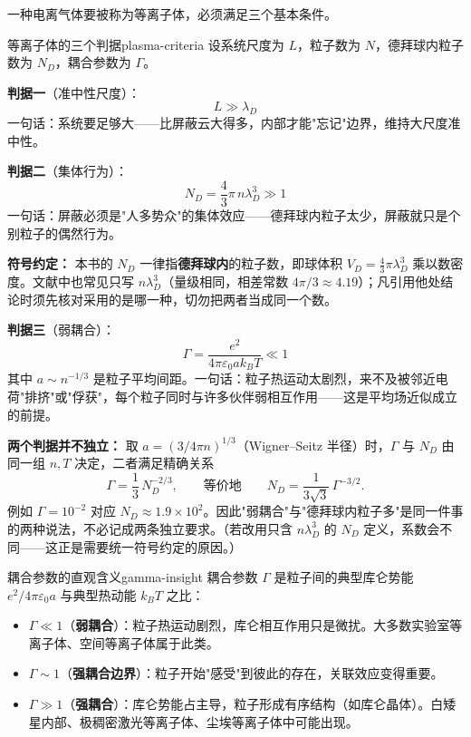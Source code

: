 \documentclass[12pt,a4paper,openany,oneside]{book}
\newcommand{\eps}{\varepsilon}
\begin{document}
一种电离气体要被称为等离子体，必须满足三个基本条件。

\begin{theorem}{等离子体的三个判据}{plasma-criteria}
设系统尺度为 $L$，粒子数为 $N$，德拜球内粒子数为 $N_D$，耦合参数为 $\Gamma$。

\textbf{判据一}（准中性尺度）：
\[
L \gg \lambda_D
\]
一句话：系统要足够大——比屏蔽云大得多，内部才能"忘记"边界，维持大尺度准中性。

\textbf{判据二}（集体行为）：
\[
N_D = \frac{4}{3}\pi\, n\lambda_D^3 \gg 1
\]
一句话：屏蔽必须是"人多势众"的集体效应——德拜球内粒子太少，屏蔽就只是个别粒子的偶然行为。

\textbf{符号约定：} 本书的 $N_D$ 一律指\textbf{德拜球内}的粒子数，即球体积 $V_D=\frac43\pi\lambda_D^3$ 乘以数密度。文献中也常见只写 $n\lambda_D^3$（量级相同，相差常数 $4\pi/3\approx4.19$）；凡引用他处结论时须先核对采用的是哪一种，切勿把两者当成同一个数。

\textbf{判据三}（弱耦合）：
\[
\Gamma = \frac{e^2}{4\pi\eps_0 a k_B T} \ll 1
\]
其中 $a \sim n^{-1/3}$ 是粒子平均间距。一句话：粒子热运动太剧烈，来不及被邻近电荷"排挤"或"俘获"，每个粒子同时与许多伙伴弱相互作用——这是平均场近似成立的前提。

\textbf{两个判据并不独立：} 取 $a=(3/4\pi n)^{1/3}$（Wigner--Seitz 半径）时，$\Gamma$ 与 $N_D$ 由同一组 $n,T$ 决定，二者满足精确关系
\[
\Gamma = \frac{1}{3}\,N_D^{-2/3},
\qquad\text{等价地}\qquad
N_D = \frac{1}{3\sqrt{3}}\,\Gamma^{-3/2}.
\]
例如 $\Gamma=10^{-2}$ 对应 $N_D\approx 1.9\times10^{2}$。因此"弱耦合"与"德拜球内粒子多"是同一件事的两种说法，不必记成两条独立要求。（若改用只含 $n\lambda_D^3$ 的 $N_D$ 定义，系数会不同——这正是需要统一符号约定的原因。）
\end{theorem}

\begin{insight}{耦合参数的直观含义}{gamma-insight}
耦合参数 $\Gamma$ 是粒子间的典型库仑势能 $e^2/4\pi\eps_0 a$ 与典型热动能 $k_BT$ 之比：
\begin{itemize}
\item $\Gamma \ll 1$（\textbf{弱耦合}）：粒子热运动剧烈，库仑相互作用只是微扰。大多数实验室等离子体、空间等离子体属于此类。
\item $\Gamma \sim 1$（\textbf{强耦合边界}）：粒子开始"感受"到彼此的存在，关联效应变得重要。
\item $\Gamma \gg 1$（\textbf{强耦合}）：库仑势能占主导，粒子形成有序结构（如库仑晶体）。白矮星内部、极稠密激光等离子体、尘埃等离子体中可能出现。
\end{itemize}
\end{insight}
\end{document}
